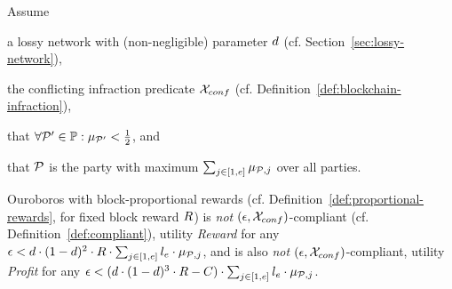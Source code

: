\begin{theorem}\label{thm:compliant-ouroboros-lossy}
    Assume
    \begin{inparaenum}[i)]
        \item a lossy network with (non-negligible) parameter
            $d$ (cf. Section~\ref{sec:lossy-network}),
        \item the conflicting infraction predicate $\mathcal{X}_{conf}$
            (cf. Definition~\ref{def:blockchain-infraction}),
        \item that $\forall \mathcal{P}' \in \mathbb{P}: \mu_{\mathcal{P}'} <
            \frac{1}{2}$, and
        \item that $\mathcal{P}$ is the party with maximum $\sum_{j \in [1, e]} \mu_{\mathcal{P}, j}$ over all parties.
    \end{inparaenum}

    Ouroboros with block-proportional rewards (cf.
    Definition~\ref{def:proportional-rewards}, for fixed block reward $R$) is \emph{not} $(\epsilon, \mathcal{X}_{conf})$-compliant (cf.
    Definition~\ref{def:compliant}), \wrt utility \emph{Reward} for any
    $\epsilon < d \cdot (1 - d)^2 \cdot R \cdot \sum_{j \in [1, e]} l_e \cdot \mu_{\mathcal{P},j}$, and is also
    \emph{not} $(\epsilon,
    \mathcal{X}_{conf})$-compliant, \wrt utility \emph{Profit} for any
    $\epsilon < (d \cdot (1 - d)^3 \cdot R - C) \cdot \sum_{j \in [1, e]} l_e \cdot \mu_{\mathcal{P}, j}$.
\end{theorem}
